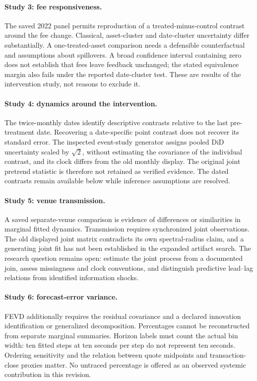 \paragraph{Study 3: fee responsiveness.}
The saved 2022 panel permits reproduction of a treated-minus-control contrast around the fee change. Classical, asset-cluster and date-cluster uncertainty differ substantially. A one-treated-asset comparison needs a defensible counterfactual and assumptions about spillovers. A broad confidence interval containing zero does not establish that fees leave feedback unchanged; the stated equivalence margin also fails under the reported date-cluster test. These are results of the intervention study, not reasons to exclude it.

\paragraph{Study 4: dynamics around the intervention.}
The twice-monthly dates identify descriptive contrasts relative to the last pre-treatment date. Recovering a date-specific point contrast does not recover its standard error. The inspected event-study generator assigns pooled DiD uncertainty scaled by $\sqrt2$, without estimating the covariance of the individual contrast, and its clock differs from the old monthly display. The original joint pretrend statistic is therefore not retained as verified evidence. The dated contrasts remain available below while inference assumptions are resolved.

\paragraph{Study 5: venue transmission.}
A saved separate-venue comparison is evidence of differences or similarities in marginal fitted dynamics. Transmission requires synchronized joint observations. The old displayed joint matrix contradicts its own spectral-radius claim, and a generating joint fit has not been established in the expanded artifact search. The research question remains open: estimate the joint process from a documented join, assess missingness and clock conventions, and distinguish predictive lead--lag relations from identified information shocks.

\paragraph{Study 6: forecast-error variance.}
FEVD additionally requires the residual covariance and a declared innovation identification or generalized decomposition. Percentages cannot be reconstructed from separate marginal summaries. Horizon labels must count the actual bin width: ten fitted steps at ten seconds per step do not represent ten seconds. Ordering sensitivity and the relation between quote midpoints and transaction-close proxies matter. No untraced percentage is offered as an observed systemic contribution in this revision.

